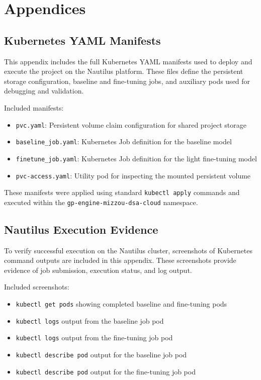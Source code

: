 \documentclass[11pt]{article}
\begin{document}
\appendix
\section{Appendices}

\subsection{Kubernetes YAML Manifests}

This appendix includes the full Kubernetes YAML manifests used to deploy and execute the project on the Nautilus platform. These files define the persistent storage configuration, baseline and fine-tuning jobs, and auxiliary pods used for debugging and validation.

Included manifests:
\begin{itemize}
    \item \texttt{pvc.yaml}: Persistent volume claim configuration for shared project storage
    \item \texttt{baseline\_job.yaml}: Kubernetes Job definition for the baseline model
    \item \texttt{finetune\_job.yaml}: Kubernetes Job definition for the light fine-tuning model
    \item \texttt{pvc-access.yaml}: Utility pod for inspecting the mounted persistent volume
\end{itemize}

These manifests were applied using standard \texttt{kubectl apply} commands and executed within the \texttt{gp-engine-mizzou-dsa-cloud} namespace.

\subsection{Nautilus Execution Evidence}

To verify successful execution on the Nautilus cluster, screenshots of Kubernetes command outputs are included in this appendix. These screenshots provide evidence of job submission, execution status, and log output.

Included screenshots:
\begin{itemize}
    \item \texttt{kubectl get pods} showing completed baseline and fine-tuning pods
    \item \texttt{kubectl logs} output from the baseline job pod
    \item \texttt{kubectl logs} output from the fine-tuning job pod
    \item \texttt{kubectl describe pod} output for the baseline job pod
    \item \texttt{kubectl describe pod} output for the fine-tuning job pod
\end{itemize}
\end{document}
